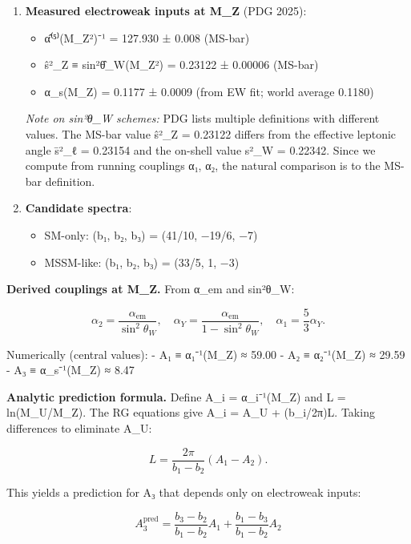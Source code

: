 \documentclass[
]{article}
\providecommand{\tightlist}{%
  \setlength{\itemsep}{0pt}\setlength{\parskip}{0pt}}
\begin{document}
\begin{enumerate}
\def\labelenumi{\arabic{enumi}.}
\setcounter{enumi}{2}
\item
  \textbf{Measured electroweak inputs at M\_Z} (PDG 2025):

  \begin{itemize}
  \tightlist
  \item
    α̂⁽⁵⁾(M\_Z²)⁻¹ = 127.930 ± 0.008 (MS-bar)
  \item
    ŝ²\_Z ≡ sin²θ̂\_W(M\_Z²) = 0.23122 ± 0.00006 (MS-bar)
  \item
    α\_s(M\_Z) = 0.1177 ± 0.0009 (from EW fit; world average 0.1180)
  \end{itemize}

  \emph{Note on sin²θ\_W schemes:} PDG lists multiple definitions with
  different values. The MS-bar value ŝ²\_Z = 0.23122 differs from the
  effective leptonic angle s̄²\_ℓ = 0.23154 and the on-shell value s²\_W
  = 0.22342. Since we compute from running couplings α₁, α₂, the natural
  comparison is to the MS-bar definition.
\item
  \textbf{Candidate spectra}:

  \begin{itemize}
  \tightlist
  \item
    SM-only: (b₁, b₂, b₃) = (41/10, −19/6, −7)
  \item
    MSSM-like: (b₁, b₂, b₃) = (33/5, 1, −3)
  \end{itemize}
\end{enumerate}

\textbf{Derived couplings at M\_Z.} From α\_em and sin²θ\_W:

\[
\alpha_2 = \frac{\alpha_{\mathrm{em}}}{\sin^2\theta_W}, \quad
\alpha_Y = \frac{\alpha_{\mathrm{em}}}{1 - \sin^2\theta_W}, \quad
\alpha_1 = \frac{5}{3}\alpha_Y.
\]

Numerically (central values): - A₁ ≡ α₁⁻¹(M\_Z) ≈ 59.00 - A₂ ≡
α₂⁻¹(M\_Z) ≈ 29.59 - A₃ ≡ α\_s⁻¹(M\_Z) ≈ 8.47

\textbf{Analytic prediction formula.} Define A\_i = α\_i⁻¹(M\_Z) and L =
ln(M\_U/M\_Z). The RG equations give A\_i = A\_U + (b\_i/2π)L. Taking
differences to eliminate A\_U:

\[
L = \frac{2\pi}{b_1 - b_2}(A_1 - A_2).
\]

This yields a prediction for A₃ that depends only on electroweak inputs:

\[
A_3^\mathrm{pred} = \frac{b_3 - b_2}{b_1 - b_2} A_1 + \frac{b_1 - b_3}{b_1 - b_2} A_2
\]
\end{document}
